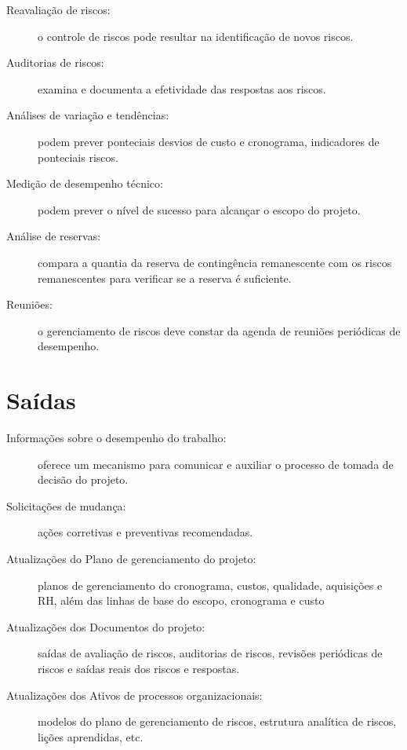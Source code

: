 \begin{description}
	
	\item[Reavaliação de riscos:] o controle de riscos pode resultar na identificação de novos riscos.
	
	\item[Auditorias de riscos:] examina e documenta a efetividade das respostas aos riscos.
	
	\item[Análises de variação e tendências:] podem prever ponteciais desvios de custo e cronograma, indicadores de ponteciais riscos.
	
	\item[Medição de desempenho técnico:] podem prever o nível de sucesso para alcançar o escopo do projeto.
	
	\item[Análise de reservas:] compara a quantia da reserva de contingência remanescente com os riscos remanescentes para verificar se a reserva é suficiente.
	
	\item[Reuniões:] o gerenciamento de riscos deve constar da agenda de reuniões periódicas de desempenho.
	
\end{description}

\section{Saídas}

\begin{description}
	
	\item[Informações sobre o desempenho do trabalho:] oferece um mecanismo para comunicar e auxiliar o processo de tomada de decisão do projeto.
	
	\item[Solicitações de mudança:] ações corretivas e preventivas recomendadas.
	
	\item[Atualizações do Plano de gerenciamento do projeto:] planos de gerenciamento do cronograma, custos, qualidade, aquisições e RH, além das linhas de base do escopo, cronograma e custo
	
	\item[Atualizações dos Documentos do projeto:] saídas de avaliação de riscos, auditorias de riscos, revisões periódicas de riscos e saídas reais dos riscos e respostas.
	
	\item[Atualizações dos Ativos de processos organizacionais:] modelos do plano de gerenciamento de riscos, estrutura analítica de riscos, lições aprendidas, etc.
	
\end{description}